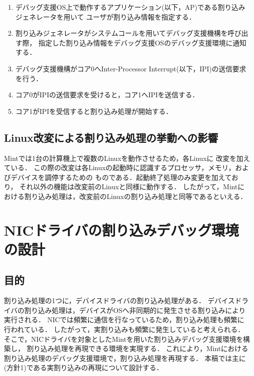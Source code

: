 \documentclass[submit,techreq,noauthor,dvipdfmx]{ipsj}
\begin{document}
\begin{enumerate}
    \item 
        デバッグ支援OS上で動作するアプリケーション(以下，AP)である割り込みジェネレータを用いて
        ユーザが割り込み情報を指定する．
    \item 
        割り込みジェネレータがシステムコールを用いてデバッグ支援機構を呼び出す際，
        指定した割り込み情報をデバッグ支援OSのデバッグ支援環境に通知する．   
    \item 
        デバッグ支援機構がコア0へInter-Processor Interrupt(以下，IPI)の送信要求を行う．
    \item 
        コア0がIPIの送信要求を受けると，コア1へIPIを送信する．
    \item 
        コア1がIPIを受信すると割り込み処理が開始する．
\end{enumerate}

\subsection{Linux改変による割り込み処理の挙動への影響}\label{sec:impact_to_linux}

Mintでは1台の計算機上で複数のLinuxを動作させるため，各Linuxに
改変を加えている\cite{kitagawa}．
この際の改変は各Linuxの起動時に認識するプロセッサ，メモリ，およびデバイスを調停するための
ものである．起動終了処理のみ変更を加えており，
それ以外の機能は改変前のLinuxと同様に動作する．
したがって，Mintにおける割り込み処理は，改変前のLinuxの割り込み処理と同等であるといえる．

\section{NICドライバの割り込みデバッグ環境の設計}\label{chap:design_of_debugging_invironment_of_NIC}

\subsection{目的}\label{sec:purpose}

割り込み処理の1つに，デバイスドライバの割り込み処理がある．
デバイスドライバの割り込み処理は，デバイスがOSへ非同期的に発生させる割り込みにより
実行される．
NICでは頻繁に通信を行なっているため，割り込み処理も頻繁に行われている．
したがって，実割り込みも頻繁に発生していると考えられる．
そこで，NICドライバを対象としたMintを用いた割り込みデバッグ支援環境を構築し，
割り込み処理を再現できる環境を実現する．
これにより，Mintにおける割り込み処理のデバッグ支援環境で，割り込み処理を再現する．
本稿では主に(方針1)である実割り込みの再現について設計する．
\end{document}

